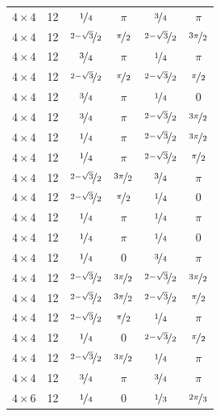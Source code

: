 \documentclass{article}
\begin{document}
\begin{longtable}{cccccc}
$4 \times 4$ & 12 & $\nicefrac{1}{4}$ & $\pi$ & $\nicefrac{3}{4}$ & $\pi$ \\
$4 \times 4$ & 12 & $\nicefrac{2-\sqrt{3}}{2}$ & $\nicefrac{\pi}{2}$ & $\nicefrac{2-\sqrt{3}}{2}$ & $\nicefrac{3\pi}{2}$ \\
$4 \times 4$ & 12 & $\nicefrac{3}{4}$ & $\pi$ & $\nicefrac{1}{4}$ & $\pi$ \\
$4 \times 4$ & 12 & $\nicefrac{2-\sqrt{3}}{2}$ & $\nicefrac{\pi}{2}$ & $\nicefrac{2-\sqrt{3}}{2}$ & $\nicefrac{\pi}{2}$ \\
$4 \times 4$ & 12 & $\nicefrac{3}{4}$ & $\pi$ & $\nicefrac{1}{4}$ & 0 \\
$4 \times 4$ & 12 & $\nicefrac{3}{4}$ & $\pi$ & $\nicefrac{2-\sqrt{3}}{2}$ & $\nicefrac{3\pi}{2}$ \\
$4 \times 4$ & 12 & $\nicefrac{1}{4}$ & $\pi$ & $\nicefrac{2-\sqrt{3}}{2}$ & $\nicefrac{3\pi}{2}$ \\
$4 \times 4$ & 12 & $\nicefrac{1}{4}$ & $\pi$ & $\nicefrac{2-\sqrt{3}}{2}$ & $\nicefrac{\pi}{2}$ \\
$4 \times 4$ & 12 & $\nicefrac{2-\sqrt{3}}{2}$ & $\nicefrac{3\pi}{2}$ & $\nicefrac{3}{4}$ & $\pi$ \\
$4 \times 4$ & 12 & $\nicefrac{2-\sqrt{3}}{2}$ & $\nicefrac{\pi}{2}$ & $\nicefrac{1}{4}$ & 0 \\
$4 \times 4$ & 12 & $\nicefrac{1}{4}$ & $\pi$ & $\nicefrac{1}{4}$ & $\pi$ \\
$4 \times 4$ & 12 & $\nicefrac{1}{4}$ & $\pi$ & $\nicefrac{1}{4}$ & 0 \\
$4 \times 4$ & 12 & $\nicefrac{1}{4}$ & 0 & $\nicefrac{3}{4}$ & $\pi$ \\
$4 \times 4$ & 12 & $\nicefrac{2-\sqrt{3}}{2}$ & $\nicefrac{3\pi}{2}$ & $\nicefrac{2-\sqrt{3}}{2}$ & $\nicefrac{3\pi}{2}$ \\
$4 \times 4$ & 12 & $\nicefrac{2-\sqrt{3}}{2}$ & $\nicefrac{3\pi}{2}$ & $\nicefrac{2-\sqrt{3}}{2}$ & $\nicefrac{\pi}{2}$ \\
$4 \times 4$ & 12 & $\nicefrac{2-\sqrt{3}}{2}$ & $\nicefrac{\pi}{2}$ & $\nicefrac{1}{4}$ & $\pi$ \\
$4 \times 4$ & 12 & $\nicefrac{1}{4}$ & 0 & $\nicefrac{2-\sqrt{3}}{2}$ & $\nicefrac{\pi}{2}$ \\
$4 \times 4$ & 12 & $\nicefrac{2-\sqrt{3}}{2}$ & $\nicefrac{3\pi}{2}$ & $\nicefrac{1}{4}$ & $\pi$ \\
$4 \times 4$ & 12 & $\nicefrac{3}{4}$ & $\pi$ & $\nicefrac{3}{4}$ & $\pi$ \\
$4 \times 6$ & 12 & $\nicefrac{1}{4}$ & 0 & $\nicefrac{1}{3}$ & $\nicefrac{2\pi}{3}$ \\

\end{longtable}
\end{document}
